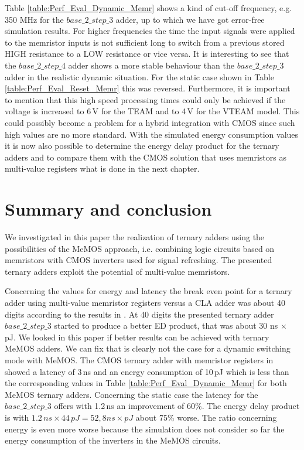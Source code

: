 \documentclass[pageno]{jpaper}
\begin{document}
Table \ref{table:Perf_Eval_Dynamic_Memr} shows a kind of cut-off frequency, e.g. 350 MHz for the $base\_2\_step\_3$ adder, up to which we have got error-free simulation results. For higher frequencies the time the input signals were applied to the memristor inputs is not sufficient long to switch from a previous stored HIGH resistance to a LOW resistance or vice versa. It is interesting to see that the $base\_2\_step\_4$ adder shows a more stable behaviour than the $base\_2\_step\_3$ adder in the realistic dynamic situation. For the static case shown in Table \ref{table:Perf_Eval_Reset_Memr} this was reversed. Furthermore, it is important to mention that this high speed processing times could only be achieved if the voltage is increased to 6\,V for the TEAM and to 4\,V for the VTEAM model. This could possibly become a problem for a hybrid integration with CMOS since such high values are no more standard. With the simulated energy consumption values it is now also possible to determine the energy delay product for the ternary adders and to compare them with the CMOS solution that uses memristors as multi-value registers what is done in the next chapter. 

\section{Summary and conclusion}  

We investigated in this paper the realization of ternary adders using the possibilities of the MeMOS approach, i.e. combining logic circuits based on memristors with CMOS inverters used for signal refreshing. The presented ternary adders exploit the potential of multi-value memristors. 
 
Concerning the values for energy and latency the break even point for a ternary adder using multi-value memristor registers versus a CLA adder was about 40 digits according to the results in \cite{MemSysPaper}. At 40 digits the presented ternary adder $base\_2\_step\_3$ started to produce a better ED product, that was about 30 ns $ \times $ pJ. We looked in this paper if better results can be achieved with ternary MeMOS adders. We can fix that is clearly not the case for a dynamic switching mode with MeMOS. The CMOS ternary adder with memristor registers in \cite{MemSysPaper} showed a latency of 3\,ns and an energy consumption of 10\,pJ which is less than the corresponding values in Table \ref{table:Perf_Eval_Dynamic_Memr} for both MeMOS ternary adders. Concerning the static case the latency for the $base\_2\_step\_3$ offers with 1.2\,ns an improvement of 60\%. The energy delay product is with $1.2\,ns \times 44\,pJ = 52,8 ns \times pJ$ about 75\% worse. The ratio concerning energy is even more worse because the simulation does not consider so far the energy consumption of the inverters in the MeMOS circuits. 
\end{document}
